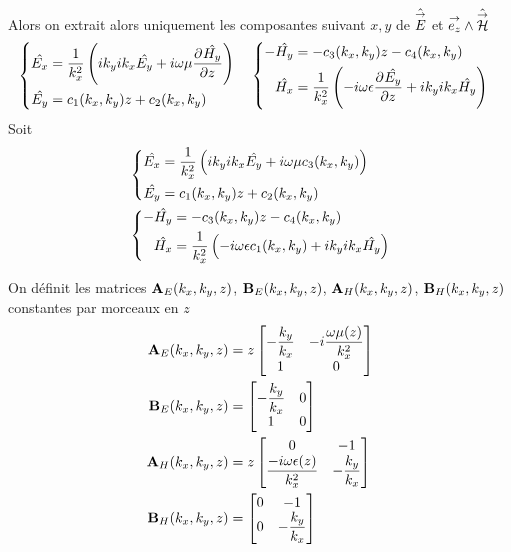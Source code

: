  Alors on extrait alors uniquement les composantes suivant \(x,y\) de \(\hat{\vE}\) et \(\vect{e_z} \pvect \hat{\vH}\)
  \begin{align*}
  &\left\lbrace
    \begin{aligned}
      \hat{E_x} &= \frac{1}{k_x^2}\left(ik_yik_x\hat{E_y} + i\w\mu\ddr{z}{\hat{H_y}}\right)
      \\
      \hat{E_y} &= c_1(k_x,k_y)z + c_2(k_x,k_y)
    \end{aligned}
  \right.    
  &&
  \left\lbrace
    \begin{aligned}
      -\hat{H_y} &= -c_3(k_x,k_y)z - c_4(k_x,k_y)
      \\
      \hat{H_x} &= \frac{1}{k_x^2}\left(-i\w\eps\ddr{z}{\hat{E_y}} + ik_yik_x\hat{H_y}\right)
    \end{aligned}
    \right.
  \end{align*}
  Soit
  \begin{align*}
  &\left\lbrace
    \begin{aligned}
      \hat{E_x} &= \frac{1}{k_x^2}\left(ik_yik_x\hat{E_y} + i\w\mu c_3(k_x,k_y)\right)
      \\
      \hat{E_y} &= c_1(k_x,k_y)z + c_2(k_x,k_y)
    \end{aligned}
  \right.    
  \\&
  \left\lbrace
    \begin{aligned}
      -\hat{H_y} &= -c_3(k_x,k_y)z - c_4(k_x,k_y)
      \\
      \hat{H_x} &= \frac{1}{k_x^2}\left(-i\w\eps c_1(k_x,k_y) + ik_yik_x\hat{H_y}\right)
    \end{aligned}
    \right.
  \end{align*}

  On définit les matrices \(\mA_{E}(k_x,k_y,z)\), \(\mB_{E}(k_x,k_y,z)\), \(\mA_{H}(k_x,k_y,z)\), \(\mB_{H}(k_x,k_y,z)\) constantes par morceaux en \(z\)
  \begin{align*}
    \mA_{E}(k_x,k_y,z) &= z
    \begin{bmatrix}
      -\frac{k_y}{k_x} & -i\frac{\w\mu(z)}{k_x^2}
      \\
      1 & 0
    \end{bmatrix}
    \\
    \mB_{E}(k_x,k_y,z) &= 
    \begin{bmatrix}
      -\frac{k_y}{k_x} & 0
      \\
      1 & 0
    \end{bmatrix}
    \\
    \mA_{H}(k_x,k_y,z) &= z
    \begin{bmatrix}
      0 & -1
      \\
      \frac{-i\w\eps(z)}{k_x^2} & -\frac{k_y}{k_x}
    \end{bmatrix}
    \\
    \mB_{H}(k_x,k_y,z) &= 
    \begin{bmatrix}
      0 & -1
      \\
      0 & -\frac{k_y}{k_x}
    \end{bmatrix}
  \end{align*}

